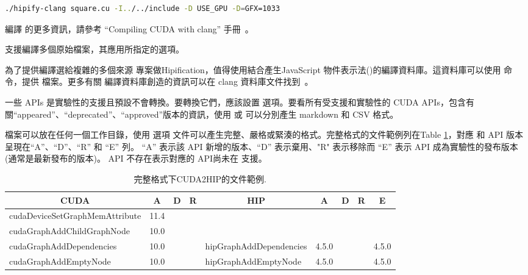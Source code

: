 \begin{lstlisting}[language=bash]
./hipify-clang square.cu -I../../include -D USE_GPU -D=GFX=1033
\end{lstlisting}

編譯  的更多資訊，請參考 “Compiling CUDA with clang” 手冊~\cite{Compiling-CUDA-with-clang}。

 支援編譯多個原始檔案，其應用所指定的選項。

為了提供編譯選給複雜的多個來源  專案做Hipification，值得使用結合產生JavaScript 物件表示法()的編譯資料庫。這資料庫可以使用  命令，提供  檔案。更多有關  編譯資料庫創造的資訊可以在 clang  資料庫文件找到~\cite{Clang-JSON-Compilation-Database}。

一些  APIs 是實驗性的支援且預設不會轉換。要轉換它們，應該設置  選項。要看所有受支援和實驗性的 CUDA APIs，包含有關“appeared”、“deprecated”、“approved”版本的資訊，使用  或  可以分別產生 markdown 和 CSV 格式。

檔案可以放在任何一個工作目錄，使用 選項  文件可以產生完整、嚴格或緊湊的格式。完整格式的文件範例列在Table \ref{tab:CUDA2HIP}，對應  和  API 版本呈現在“A”、“D”、“R” 和 “E” 列。 “A” 表示該 API 新增的版本、“D” 表示棄用、"R" 表示移除而 “E” 表示 API 成為實驗性的發布版本(通常是最新發布的版本)。 API 不存在表示對應的  API尚未在  支援。

\begin{table}[htbp]
    \centering
    \begin{tabular}{@{}lccclcccc}
        \toprule
        \multicolumn{1}{c}{CUDA} & \multicolumn{1}{c}{A} & \multicolumn{1}{c}{D} & \multicolumn{1}{c}{R} & \multicolumn{1}{c}{HIP} & \multicolumn{1}{c}{A} & \multicolumn{1}{c}{D} & \multicolumn{1}{c}{R} & \multicolumn{1}{c}{E} \\
        \midrule
        cudaDeviceSetGraphMemAttribute & 11.4 \\
        cudaGraphAddChildGraphNode & 10.0 \\
        cudaGraphAddDependencies & 10.0 &&& hipGraphAddDependencies & 4.5.0 &&& 4.5.0 \\
        cudaGraphAddEmptyNode & 10.0 &&& hipGraphAddEmptyNode & 4.5.0 &&& 4.5.0 \\
        \bottomrule
    \end{tabular}
    \caption{完整格式下CUDA2HIP的文件範例.}
    \label{tab:CUDA2HIP}
\end{table}


